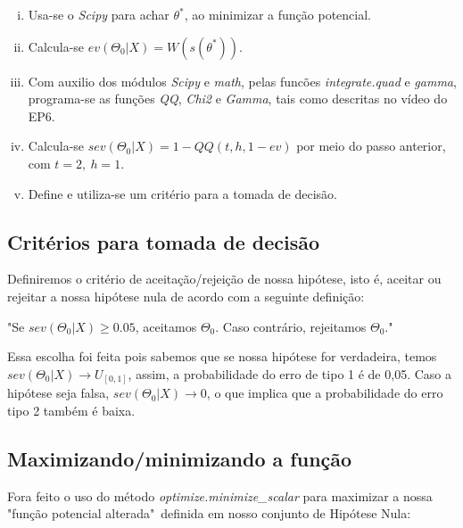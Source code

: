 \documentclass[11pt, a4paper]{article}
\begin{document}
\begin{enumerate}[i)]

    \item Usa-se o \textit{Scipy} para achar $\theta^*$, ao minimizar a função potencial.
    
    \item Calcula-se $ev(\Theta_0|X) =W(s(\theta^*))$.
    
    \item Com auxilio dos módulos \textit{Scipy} e \textit{math}, pelas funcões \textit{integrate.quad} e \textit{gamma}, programa-se as funções \textit{QQ}, \textit{Chi2} e \textit{Gamma}, tais como descritas no vídeo do EP6.
    
    \item Calcula-se $sev(\Theta_0|X) = 1-QQ(t,h,1-ev)$ por meio do passo anterior, com $t=2, \ h=1$.
    
    \item Define e utiliza-se um critério para a tomada de decisão.
    
\end{enumerate}

 
\subsection{Critérios para tomada de decisão}

Definiremos o critério de aceitação/rejeição de nossa hipótese, isto é, aceitar ou rejeitar a nossa hipótese nula de acordo com a seguinte definição: 

\begin{center}
"Se $sev(\Theta_0|X) \geq 0.05$, aceitamos $\Theta_0$. Caso contrário, rejeitamos $\Theta_0$."
\end{center}


Essa escolha foi feita pois sabemos que se nossa hipótese for verdadeira, temos  $sev(\Theta_0|X) \rightarrow U_{[0,1]}$, assim, a probabilidade do erro de tipo 1 é de 0,05. Caso a hipótese seja falsa, $sev(\Theta_0|X) \rightarrow 0$, o que implica que a probabilidade do erro tipo 2 também é baixa.
 
 
 
\subsection{Maximizando/minimizando a função}
Fora feito o uso do método \textit{optimize.minimize\_scalar} para maximizar a nossa "função potencial alterada"\ definida em nosso conjunto de Hipótese Nula:
\end{document}
